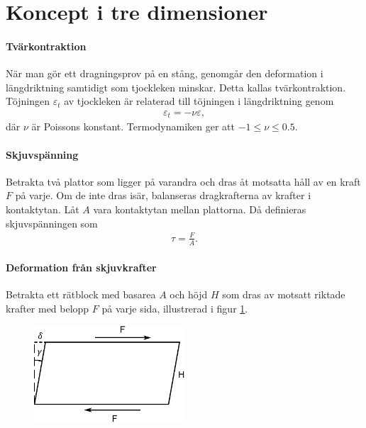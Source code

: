 \section{Koncept i tre dimensioner}

\paragraph{Tvärkontraktion}
När man gör ett dragningsprov på en stång, genomgår den deformation i längdriktning samtidigt som tjockleken minskar. Detta kallas tvärkontraktion. Töjningen $\varepsilon_{t}$ av tjockleken är relaterad till töjningen i längdriktning genom
\begin{align*}
	\varepsilon_{t} = -\nu\varepsilon,
\end{align*}
där $\nu$ är Poissons konstant. Termodynamiken ger att $-1\leq\nu\leq 0.5$.

\paragraph{Skjuvspänning}
Betrakta två plattor som ligger på varandra och dras åt motsatta håll av en kraft $F$ på varje. Om de inte dras isär, balanseras dragkrafterna av krafter i kontaktytan. Låt $A$ vara kontaktytan mellan plattorna. Då definieras skjuvspänningen som
\begin{align*}
	\tau = \frac{F}{A}.
\end{align*}

\paragraph{Deformation från skjuvkrafter}
Betrakta ett rätblock med basarea $A$ och höjd $H$ som dras av motsatt riktade krafter med belopp $F$ på varje sida, illustrerad i figur \ref{fig:rectangle_twist}.
\begin{figure}[!ht]
	\centering
	\includegraphics[width = 0.5\textwidth]{./Images/rectangle_twist.eps}
	\label{fig:rectangle_twist}
\end{figure}

